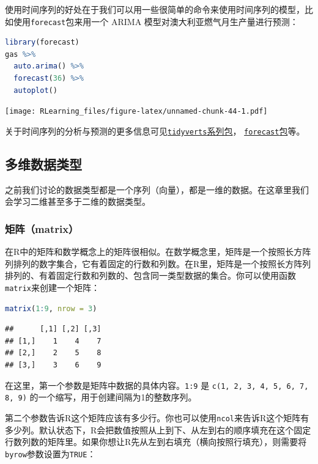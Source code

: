 \documentclass[]{ctexbook}
\newcommand{\passthrough}[1]{#1}
\begin{document}
使用时间序列的好处在于我们可以用一些很简单的命令来使用时间序列的模型，比如使用\passthrough{\lstinline!forecast!}包来用一个 ARIMA 模型对澳大利亚燃气月生产量进行预测：

\begin{lstlisting}[language=R]
library(forecast)
gas %>% 
  auto.arima() %>% 
  forecast(36) %>% 
  autoplot()
\end{lstlisting}

\texttt{[image: RLearning\_files/figure-latex/unnamed-chunk-44-1.pdf]}

关于时间序列的分析与预测的更多信息可见\href{https://tidyverts.org/}{\passthrough{\lstinline!tidyverts!}系列包}， \href{https://pkg.robjhyndman.com/forecast/}{\passthrough{\lstinline!forecast!}包}等。

\hypertarget{ux591aux7ef4ux6570ux636eux7c7bux578b}{%
\subsection{多维数据类型}\label{ux591aux7ef4ux6570ux636eux7c7bux578b}}

之前我们讨论的数据类型都是一个序列（向量），都是一维的数据。在这章里我们会学习二维甚至多于二维的数据类型。

\hypertarget{ux77e9ux9635matrix}{%
\subsubsection{矩阵（matrix）}\label{ux77e9ux9635matrix}}

在R中的矩阵和数学概念上的矩阵很相似。在数学概念里，矩阵是一个按照长方阵列排列的数字集合，它有着固定的行数和列数。在R里，矩阵是一个按照长方阵列排列的、有着固定行数和列数的、包含同一类型数据的集合。你可以使用函数\passthrough{\lstinline!matrix!}来创建一个矩阵：

\begin{lstlisting}[language=R]
matrix(1:9, nrow = 3)
\end{lstlisting}

\begin{lstlisting}
##      [,1] [,2] [,3]
## [1,]    1    4    7
## [2,]    2    5    8
## [3,]    3    6    9
\end{lstlisting}

在这里，第一个参数是矩阵中数据的具体内容。\passthrough{\lstinline!1:9!} 是 \passthrough{\lstinline!c(1, 2, 3, 4, 5, 6, 7, 8, 9)!} 的一个缩写，用于创建间隔为1的整数序列。

第二个参数告诉R这个矩阵应该有多少行。你也可以使用\passthrough{\lstinline!ncol!}来告诉R这个矩阵有多少列。默认状态下，R会把数值按照从上到下、从左到右的顺序填充在这个固定行数列数的矩阵里。如果你想让R先从左到右填充（横向按照行填充），则需要将\passthrough{\lstinline!byrow!}参数设置为\passthrough{\lstinline!TRUE!}：
\end{document}
